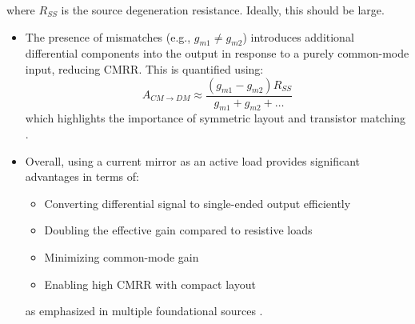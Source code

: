 where \(R_{SS}\) is the source degeneration resistance. Ideally, this should be large.
\begin{itemize}
    \item The presence of mismatches (e.g., \(g_{m1} \neq g_{m2}\)) introduces additional differential components into the output in response to a purely common-mode input, reducing CMRR. This is quantified using:
    \[
    A_{CM \to DM} \approx \frac{(g_{m1} - g_{m2}) R_{SS}}{g_{m1} + g_{m2} + \dots}
    \]
    which highlights the importance of symmetric layout and transistor matching 
\cite{iiitd_lecture16}.
\end{itemize}

\begin{itemize}
    \item Overall, using a current mirror as an active load provides significant advantages in terms of:
        \begin{itemize}
            \item Converting differential signal to single-ended output efficiently
            \item Doubling the effective gain compared to resistive loads
            \item Minimizing common-mode gain
            \item Enabling high CMRR with compact layout
        \end{itemize}
    as emphasized in multiple foundational sources \cite{rajesh_differential_2014, fonstad_mit2009, iiitd_lecture16}.
\end{itemize}


\newpage


